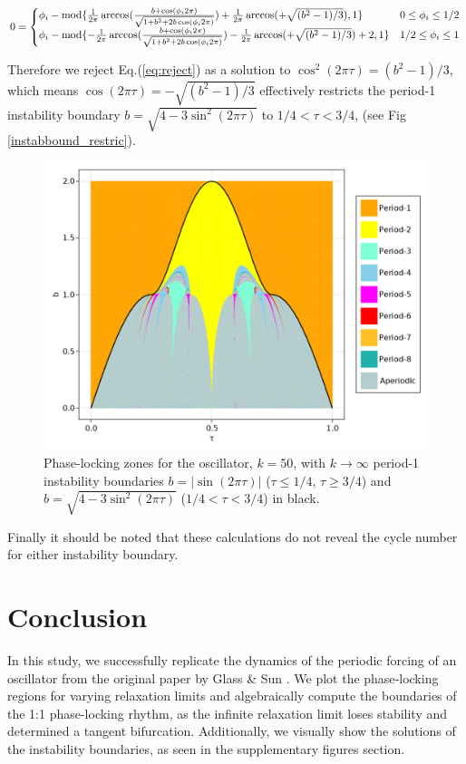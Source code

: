 \begin{equation} 
    0 = 
    \begin{cases}
       \phi_i - \textnormal{mod} \{\frac{1}{2\pi}\arccos(\frac{b+\cos(\phi_i 2\pi)}{\sqrt{1+b^2+2b\cos(\phi_i 2\pi)}}) + \frac{1}{2\pi}\arccos(+\sqrt{(b^2 - 1)/3}),1\}& 0 \leq \phi_i \leq 1/2 \\
       \phi_i - \textnormal{mod} \{-\frac{1}{2\pi}\arccos(\frac{b+\cos(\phi_i 2\pi)}{\sqrt{1+b^2+2b\cos(\phi_i 2\pi)}})-\frac{1}{2\pi}\arccos(+\sqrt{(b^2 - 1)/3}) + 2,1\}& 1/2 \leq \phi_i \leq 1 \\
    \end{cases}
    \label{eq:wrong}
\end{equation} 

Therefore we reject Eq.(\ref{eq:reject}) as a solution to $\cos^2(2\pi\tau) = (b^2 - 1)/3$, which means $\cos(2\pi\tau) = -\sqrt{(b^2 - 1)/3}$ effectively restricts the period-1 instability boundary $b = \sqrt{4-3\sin^2(2\pi\tau)}$ to $1/4<\tau<3/4$, (see Fig \ref{instabbound_restric}).

\begin{figure}[H]
    \begin{center}
    \includegraphics[width=.8\textwidth]{figures/k50_4.png}
    \end{center}
    \caption{Phase-locking zones for the oscillator, $k=50$, with $k\rightarrow \infty$ period-1 instability boundaries $b = |\sin(2\pi\tau)|$ ($\tau \leq 1/4$, $\tau \geq 3/4$) and $b = \sqrt{4-3\sin^2(2\pi\tau)}$ ($1/4<\tau<3/4$) in black.}
    \label{}
\end{figure}

Finally it should be noted that these calculations do not reveal the cycle number for either instability boundary.

\section{Conclusion}

In this study, we successfully replicate the dynamics of the periodic forcing of an oscillator from the original paper by Glass \& Sun \supercite{GLASS1994}. We plot the phase‐locking regions for varying relaxation limits and algebraically compute the boundaries of the 1:1 phase-locking rhythm, as the infinite relaxation limit loses stability and determined a tangent bifurcation. Additionally, we visually show the solutions of the instability boundaries, as seen in the supplementary figures section. 